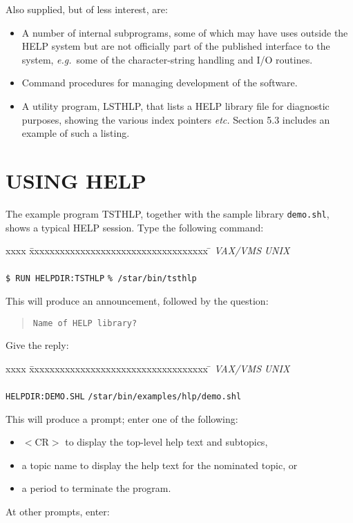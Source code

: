 Also supplied, but of less interest, are:
\begin{itemize}
\item A number of internal subprograms, some of which may have uses outside
the HELP system but are not officially part of the published interface
to the system,
{\it e.g.}\ some of the
character-string handling and I/O routines.
\item Command procedures for managing development of the software.
\item A utility program, LSTHLP, that lists a HELP library
file for diagnostic purposes, showing the various index pointers {\it etc.}
Section 5.3 includes an example of such a listing.
\end{itemize}

\section{USING HELP}
The example program TSTHLP, together with the sample library \verb|demo.shl|,
shows a typical HELP session.
Type the following command:
\begin{tabbing}
xxxx \= xxxxxxxxxxxxxxxxxxxxxxxxxxxxxxxxxxx \= \kill
\> {\it VAX/VMS} \> {\it UNIX} \\ \\
\> \verb|$ RUN HELPDIR:TSTHLP| \> \verb|% /star/bin/tsthlp| \\
\end{tabbing}
This will produce an announcement, followed by the question:
\begin{verse}
\verb|Name of HELP library?|
\end{verse}
Give the reply:
\begin{tabbing}
xxxx \= xxxxxxxxxxxxxxxxxxxxxxxxxxxxxxxxxxx \= \kill
\> {\it VAX/VMS} \> {\it UNIX} \\ \\
\> \verb|HELPDIR:DEMO.SHL| \> \verb|/star/bin/examples/hlp/demo.shl| \\
\end{tabbing}
This will produce a \fstring{:} prompt; enter one of the following:
\begin{itemize}
\item $<$CR$>$ to display the top-level help text and subtopics,
\item a topic name to display the help text for the nominated topic, or
\item a period to terminate the program.
\end{itemize}
At other prompts, enter:
